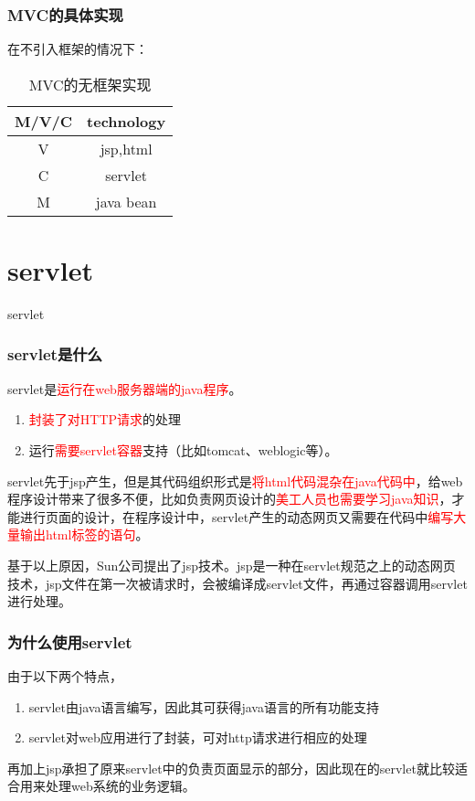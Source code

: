 \documentclass{beamer}
\begin{document}
\begin{frame}
\frametitle{MVC的具体实现}
在不引入框架的情况下：

\begin{table}
\begin{tabular}{cc}
\toprule
\textbf{M/V/C} & \textbf{technology}\\
\midrule
V & jsp,html\\
C & servlet\\
M & java bean\\
\bottomrule
\end{tabular}
\caption{MVC的无框架实现}

\end{table}
\end{frame}
\section{servlet}
\begin{frame}
\Huge{\centerline{servlet}}
\end{frame}
\begin{frame}
\frametitle{servlet是什么}
servlet是\textcolor{red}{运行在web服务器端的java程序}。
\begin{enumerate}
\item
\textcolor{red}{封装了对HTTP请求}的处理
\item
运行\textcolor{red}{需要servlet容器}支持（比如tomcat、weblogic等）。
\end{enumerate}


servlet先于jsp产生，但是其代码组织形式是\textcolor{red}{将html代码混杂在java代码中}，给web程序设计带来了很多不便，比如负责网页设计的\textcolor{red}{美工人员也需要学习java知识}，才能进行页面的设计，在程序设计中，servlet产生的动态网页又需要在代码中\textcolor{red}{编写大量输出html标签的语句}。

基于以上原因，Sun公司提出了jsp技术。jsp是一种在servlet规范之上的动态网页技术，jsp文件在第一次被请求时，会被编译成servlet文件，再通过容器调用servlet进行处理。

\end{frame}
\begin{frame}
\frametitle{为什么使用servlet}
由于以下两个特点，
\begin{enumerate}
\item
servlet由java语言编写，因此其可获得java语言的所有功能支持
\item
servlet对web应用进行了封装，可对http请求进行相应的处理
\end{enumerate}
再加上jsp承担了原来servlet中的负责页面显示的部分，因此现在的servlet就比较适合用来处理web系统的业务逻辑。
\end{frame}
\end{document}
